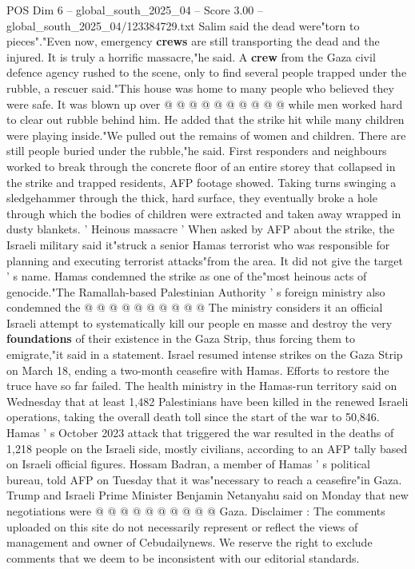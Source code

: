 \begin{textsample}{POS Dim 6 – global\_south\_2025\_04 – Score 3.00 – global\_south\_2025\_04/123384729.txt}
Salim said the dead were"torn to pieces"."Even now, emergency \textbf{crews} are still transporting the dead and the injured.
It is truly a horrific massacre,"he said.
A \textbf{crew} from the Gaza civil defence agency rushed to the scene, only to find several people trapped under the rubble, a rescuer said."This house was home to many people who believed they were safe.
It was blown up over @ @ @ @ @ @ @ @ @ @ while men worked hard to clear out rubble behind him.
He added that the strike hit while many children were playing inside."We pulled out the remains of women and children.
There are still people buried under the rubble,"he said.
First responders and neighbours worked to break through the concrete floor of an entire storey that collapsed in the strike and trapped residents, AFP footage showed.
Taking turns swinging a sledgehammer through the thick, hard surface, they eventually broke a hole through which the bodies of children were extracted and taken away wrapped in dusty blankets. ' Heinous massacre ' When asked by AFP about the strike, the Israeli military said it"struck a senior Hamas terrorist who was responsible for planning and executing terrorist attacks"from the area.
It did not give the target ' s name.
Hamas condemned the strike as one of the"most heinous acts of genocide."The Ramallah-based Palestinian Authority ' s foreign ministry also condemned the @ @ @ @ @ @ @ @ @ @ The ministry considers it an official Israeli attempt to systematically kill our people en masse and destroy the very \textbf{foundations} of their existence in the Gaza Strip, thus forcing them to emigrate,"it said in a statement.
Israel resumed intense strikes on the Gaza Strip on March 18, ending a two-month ceasefire with Hamas.
Efforts to restore the truce have so far failed.
The health ministry in the Hamas-run territory said on Wednesday that at least 1,482 Palestinians have been killed in the renewed Israeli operations, taking the overall death toll since the start of the war to 50,846.
Hamas ' s October 2023 attack that triggered the war resulted in the deaths of 1,218 people on the Israeli side, mostly civilians, according to an AFP tally based on Israeli official figures.
Hossam Badran, a member of Hamas ' s political bureau, told AFP on Tuesday that it was"necessary to reach a ceasefire"in Gaza.
Trump and Israeli Prime Minister Benjamin Netanyahu said on Monday that new negotiations were @ @ @ @ @ @ @ @ @ @ Gaza.
Disclaimer : The comments uploaded on this site do not necessarily represent or reflect the views of management and owner of Cebudailynews.
We reserve the right to exclude comments that we deem to be inconsistent with our editorial standards.

\end{textsample}
